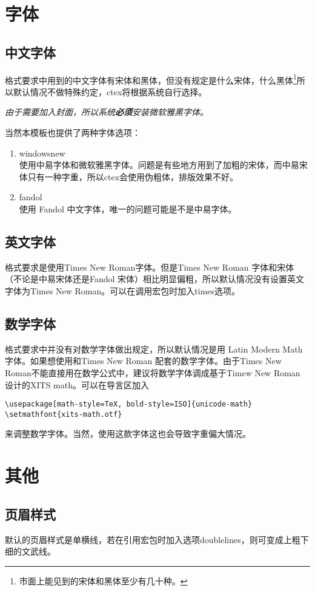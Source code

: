 \documentclass[oneside]{LZU}
\newenvironment{note}{\par\itshape\noindent{\makebox[-5pt][r]{\scriptsize\color{red!90}\textdbend\quad}}}{\par}
\newcommand{\package}[1]{{\sffamily #1}}
\begin{document}
\section{字体}
\subsection{中文字体}
格式要求中用到的中文字体有宋体和黑体，但没有规定是什么宋体，什么黑体\footnote{市面上能见到的宋体和黑体至少有几十种。}所以默认情况不做特殊约定，\package{ctex}将根据系统自行选择。
\begin{note}
    由于需要加入封面，所以系统{\bf 必须}安装微软雅黑字体。
\end{note}

当然本模板也提供了两种字体选项：
\begin{enumerate}
    \item windowsnew\\
        使用中易字体和微软雅黑字体。问题是有些地方用到了加粗的宋体，而中易宋体只有一种字重，所以\package{ctex}会使用伪粗体，排版效果不好。
    \item fandol\\
        使用 Fandol 中文字体，唯一的问题可能是不是中易字体。
\end{enumerate}
\subsection{英文字体}
格式要求是使用Times New Roman字体。但是Times New Roman 字体和宋体（不论是中易宋体还是Fandol 宋体）相比明显偏粗，所以默认情况没有设置英文字体为Times New Roman。可以在调用宏包时加入times选项。
\subsection{数学字体}
\label{subsec:math_font}
格式要求中并没有对数学字体做出规定，所以默认情况是用 Latin Modern Math 字体。如果想使用和Times New Roman 配套的数学字体。由于Times New Roman不能直接用在数学公式中，建议将数学字体调成基于Timew New Roman 设计的XITS math。可以在导言区加入
\begin{verbatim}
\usepackage[math-style=TeX, bold-style=ISO]{unicode-math}
\setmathfont{xits-math.otf}
\end{verbatim}
来调整数学字体。当然，使用这款字体这也会导致字重偏大情况。
\section{其他}
\subsection{页眉样式}
默认的页眉样式是单横线，若在引用宏包时加入选项doublelines，则可变成上粗下细的文武线。
\end{document}
